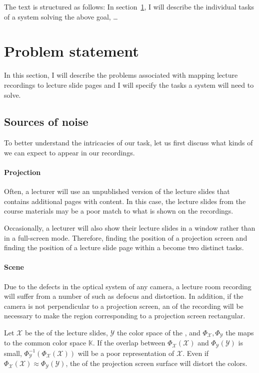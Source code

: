 The text is structured as follows: In section~\ref{sec:tasks}, I will describe
the individual tasks of a system solving the above goal, …

\section{Problem statement}
\label{sec:tasks}
In this section, I will describe the problems associated with mapping lecture
recordings to lecture slide pages and I will specify the tasks a system will
need to solve.

\subsection{Sources of noise}
\label{sec:noise}
To better understand the intricacies of our task, let us first discuss what
kinds of  we can expect to appear in our recordings.

\paragraph{Projection} Often, a lecturer will use an unpublished version of the
lecture slides that contains additional pages with 
content. In this case, the lecture slides from the course materials may be a
poor match to what is shown on the recordings.

Occasionally, a lecturer will also show their lecture slides in a window rather
than in a full-screen mode. Therefore, finding the position of a projection
screen and finding the position of a lecture slide page within a
 become two distinct tasks.

\paragraph{Scene} Due to the defects in the optical system of any camera, a
lecture room recording will suffer from a number of  such as
defocus and distortion. In addition, if the camera is not perpendicular to a
projection screen, an  of the recording
will be necessary to make the region corresponding to a projection screen
rectangular.

Let $\mathcal X$ be the  of the lecture slides, $\mathcal Y$
the color space of the , and $\Phi_{\mathcal X},\Phi_{\mathcal
Y}$ the maps to the common color space $\mathbb K$. If the overlap between
$\Phi_{\mathcal X}(\mathcal X)$ and $\Phi_{\mathcal Y}(\mathcal Y)$ is small,
$\Phi^{-1}_{\mathcal Y}(\Phi_{\mathcal X}(\mathcal X))$ will be a poor
representation of $\mathcal X$. Even if $\Phi_{\mathcal X}(\mathcal
X)\approx\Phi_{\mathcal Y}(\mathcal Y)$, the  of the
projection screen surface will distort the colors.

